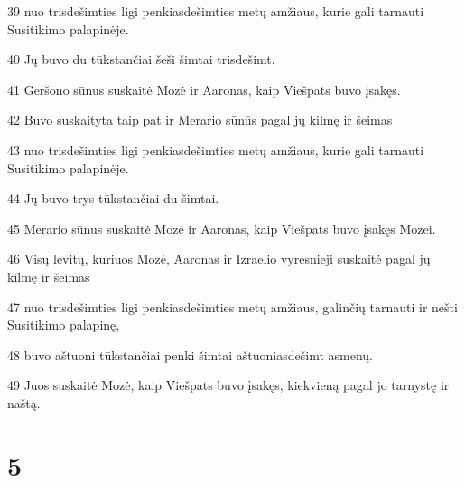 \par 39 nuo trisdešimties ligi penkiasdešimties metų amžiaus, kurie gali tarnauti Susitikimo palapinėje. 
\par 40 Jų buvo du tūkstančiai šeši šimtai trisdešimt. 
\par 41 Geršono sūnus suskaitė Mozė ir Aaronas, kaip Viešpats buvo įsakęs. 
\par 42 Buvo suskaityta taip pat ir Merario sūnūs pagal jų kilmę ir šeimas 
\par 43 nuo trisdešimties ligi penkiasdešimties metų amžiaus, kurie gali tarnauti Susitikimo palapinėje. 
\par 44 Jų buvo trys tūkstančiai du šimtai. 
\par 45 Merario sūnus suskaitė Mozė ir Aaronas, kaip Viešpats buvo įsakęs Mozei. 
\par 46 Visų levitų, kuriuos Mozė, Aaronas ir Izraelio vyresnieji suskaitė pagal jų kilmę ir šeimas 
\par 47 nuo trisdešimties ligi penkiasdešimties metų amžiaus, galinčių tarnauti ir nešti Susitikimo palapinę, 
\par 48 buvo aštuoni tūkstančiai penki šimtai aštuoniasdešimt asmenų. 
\par 49 Juos suskaitė Mozė, kaip Viešpats buvo įsakęs, kiekvieną pagal jo tarnystę ir naštą.



\chapter{5}

